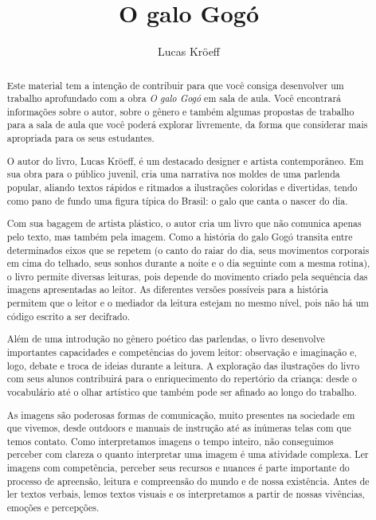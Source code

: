 \documentclass[11pt]{extarticle}
\newcommand{\AutorLivro}{Lucas Kröeff}
\newcommand{\TituloLivro}{O galo Gogó}
\newcommand{\colaborador}{Paulo Pompermaier}
\begin{document}
\title{\TituloLivro}
\author{\AutorLivro}
\def\authornotes{\colaborador}

\date{}
\maketitle

\tableofcontents

\begin{abstract}
Este material tem a intenção de contribuir para que você consiga desenvolver um trabalho aprofundado com a obra \textit{O galo Gogó} em sala de aula.
Você encontrará informações sobre o autor, sobre o gênero e também 
algumas propostas de trabalho para a sala de aula que você poderá explorar livremente, 
da forma que considerar mais apropriada para os seus estudantes.

O autor do livro, Lucas Kröeff, é um destacado designer e artista contemporâneo.
Em sua obra para o público juvenil, cria uma narrativa nos moldes de uma parlenda popular, aliando textos rápidos e ritmados a ilustrações coloridas e divertidas, tendo como pano de fundo uma figura típica do Brasil: o galo que canta o nascer do dia.

Com sua bagagem de artista plástico, o autor cria um livro que não comunica apenas pelo texto, mas também pela imagem. Como a história do galo Gogó transita entre determinados eixos que se repetem (o canto do raiar do dia, seus movimentos corporais em cima do telhado, seus sonhos durante a noite e o dia seguinte com a mesma rotina), o livro permite diversas leituras, pois depende do movimento criado pela
sequência das imagens apresentadas ao leitor. As diferentes versões possíveis 
para a história permitem que o leitor e o mediador da leitura estejam 
no mesmo nível, pois não há um código escrito a ser decifrado. 

Além de uma introdução no gênero poético das parlendas, o livro desenvolve importantes capacidades e competências do jovem leitor:
observação e imaginação e, logo, debate e troca de ideias durante 
a leitura. A exploração das ilustrações do livro com seus alunos contribuirá 
para o enriquecimento do repertório da criança: desde o vocabulário até o 
olhar artístico que também pode ser afinado ao longo do trabalho.

As imagens são poderosas formas de comunicação, 
muito presentes na sociedade em que vivemos, desde outdoors e manuais de 
instrução até as inúmeras telas com que temos contato. Como interpretamos 
imagens o tempo inteiro, não conseguimos perceber com clareza o quanto 
interpretar uma imagem é uma atividade complexa. Ler imagens com competência, 
perceber seus recursos e nuances é parte importante do processo de apreensão, 
leitura e compreensão do mundo e de nossa existência. Antes de ler textos 
verbais, lemos textos visuais e os interpretamos a partir de nossas vivências, 
emoções e percepções.


\end{abstract}
\end{document}
